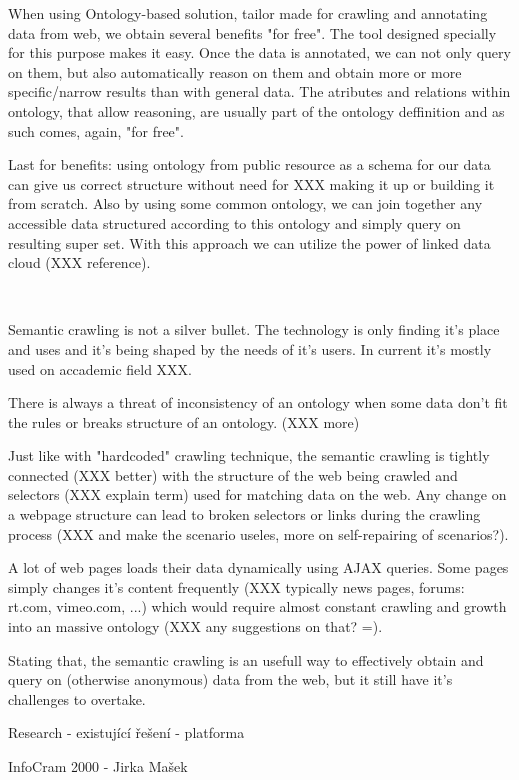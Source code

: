 When using Ontology-based solution, tailor made for crawling and annotating
data from web, we obtain several benefits "for free". The tool designed
specially for this purpose makes it easy. Once the data is annotated, we can
not only query on them, but also automatically reason on them and obtain more
or more specific/narrow results than with general data. The atributes and
relations within ontology, that allow reasoning, are usually part of the
ontology deffinition and as such comes, again, "for free". 

Last for benefits: using ontology from public resource as a schema for our data
can give us correct structure without need for XXX making it up or building it
from scratch. Also by using some common ontology, we can join together any
accessible data structured according to this ontology and simply query on
resulting super set. With this approach we can utilize the power of linked data
cloud (XXX reference). 

~

Semantic crawling is not a silver bullet. The technology is only finding it's
place and uses and it's being shaped by the needs of it's users. In current
it's mostly used on accademic field XXX. 

There is always a threat of inconsistency of an ontology when some data don't
fit the rules or breaks structure of an ontology. (XXX more)

Just like with "hardcoded" crawling technique, the semantic crawling is tightly
connected (XXX better) with the structure of the web being crawled and
selectors (XXX explain term) used for matching data on the web. Any change on a
webpage structure can lead to broken selectors or links during the crawling
process (XXX and make the scenario useles, more on self-repairing of
scenarios?). 

A lot of web pages loads their data dynamically using AJAX queries. Some pages
simply changes it's content frequently (XXX typically news pages, forums: rt.com,
vimeo.com, ...) which would require almost constant crawling and growth into an
massive ontology (XXX any suggestions on that? =). 

Stating that, the semantic crawling is an usefull way to effectively obtain and
query on (otherwise anonymous) data from the web, but it still have it's challenges
to overtake. 




\sec Research - existující řešení - platforma


\secc InfoCram 2000 - Jirka Mašek

